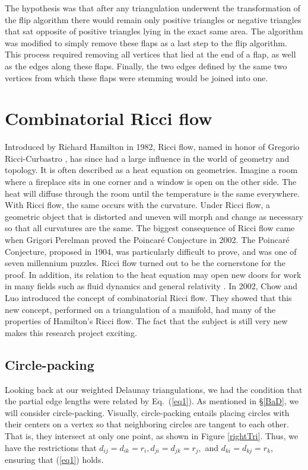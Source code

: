 \documentclass[12pt]{article}
\begin{document}
\noindent The hypothesis was that after any triangulation underwent the transformation of the flip algorithm there would remain only positive triangles or negative triangles that sat opposite of positive triangles lying in the exact same area. The algorithm was modified to simply remove these flaps as a last step to the flip algorithm. This process required removing all vertices that lied at the end of a flap, as well as the edges along these flaps. Finally, the two edges defined by the same two vertices from which these flaps were stemming would be joined into one.\newline

\section{Combinatorial Ricci flow}
\label{RBk}

Introduced by Richard Hamilton in 1982, Ricci flow, named in honor of Gregorio Ricci-Curbastro \cite{RicciBkgd}, has since had a large influence in the world of geometry and topology. It is often described as a heat equation on geometries. Imagine a room where a fireplace sits in one corner and a window is open on the other side. The heat will diffuse through the room until the temperature is the same everywhere. With Ricci flow, the same occurs with the curvature. Under Ricci flow, a geometric object that is distorted and uneven will morph and change as necessary so that all curvatures are the same. The biggest consequence of Ricci flow came when Grigori Perelman proved the Poincar\'{e} Conjecture in 2002. The Poincar\'{e} Conjecture, proposed in 1904, was particularly difficult to prove, and was one of seven millennium puzzles. Ricci flow turned out to be the cornerstone for the proof. In addition, its relation to the heat equation may open new doors for work in many fields such as fluid dynamics and general relativity \cite{RicciBkgd}. In 2002, Chow and Luo introduced the concept of combinatorial Ricci flow. They showed that this new concept, performed on a triangulation of a manifold, had many of the properties of Hamilton's Ricci flow. The fact that the subject is still very new makes this research project exciting. \newline

\subsection{Circle-packing}

\noindent Looking back at our weighted Delaunay triangulations, we had the condition that the partial edge lengths were related by Eq.~(\ref{eq1}). As mentioned in \S\ref{BaD}, we will consider circle-packing. Visually, circle-packing entails placing circles with their centers on a vertex so that neighboring circles are tangent to each other. That is, they intersect at only one point, as shown in Figure \ref{rightTri}. Thus, we have the restrictions that $d_{ij} = d_{ik} = r_i, d_{ji} = d_{jk} = r_j,$ and $d_{ki} = d_{kj} = r_k$, ensuring that (\ref{eq1}) holds.
\end{document}
